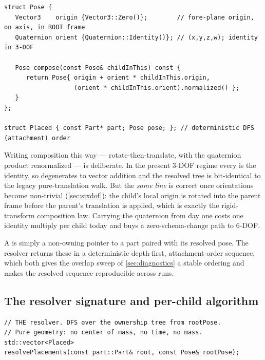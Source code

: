 \begin{listing}[htbp]
\begin{verbatim}
struct Pose {
   Vector3    origin {Vector3::Zero()};        // fore-plane origin, on axis, in ROOT frame
   Quaternion orient {Quaternion::Identity()}; // (x,y,z,w); identity in 3-DOF

   Pose compose(const Pose& childInThis) const {
      return Pose{ origin + orient * childInThis.origin,
                   (orient * childInThis.orient).normalized() };
   }
};

struct Placed { const Part* part; Pose pose; }; // deterministic DFS (attachment) order
\end{verbatim}
\caption{ and  (new, in ). 
rotates the child translation by the parent orientation before adding it, so the same code is exact
for the present pure-translation tree ( = identity) and for the future 6-DOF tree
without reshape.}\label{lst:pose}
\end{listing}

Writing composition this way --- rotate-then-translate, with the quaternion product renormalized ---
is deliberate. In the present 3-DOF regime every  is the identity, so 
degenerates to vector addition and the resolved tree is bit-identical to the legacy pure-translation
walk. But the \emph{same line} is correct once orientations become non-trivial (\cref{sec:sixdof}):
the child's local origin is rotated into the parent frame before the parent's translation is applied,
which is exactly the rigid-transform composition law. Carrying the quaternion from day one costs one
identity multiply per child today and buys a zero-schema-change path to 6-DOF.

A  is simply a non-owning pointer to a part paired with its resolved pose. The resolver
returns these in a deterministic depth-first, attachment-order sequence, which both gives the overlap
sweep of \cref{sec:diagnostics} a stable ordering and makes the resolved sequence reproducible across
runs.

\subsection{The resolver signature and per-child algorithm}

\begin{listing}[htbp]
\begin{verbatim}
// THE resolver. DFS over the ownership tree from rootPose.
// Pure geometry: no center of mass, no time, no mass.
std::vector<Placed>
resolvePlacements(const part::Part& root, const Pose& rootPose);
\end{verbatim}
\caption{The single resolver entry point (new, in ). It takes the tree
root and the pose at which to plant it (conventionally identity --- the root's fore plane, the
nose tip, at the world origin, \zfwd, the rocket extending into $-z$) and returns one 
per part.}\label{lst:resolver}
\end{listing}


